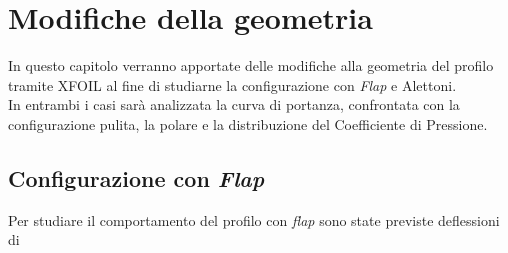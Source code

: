 \chapter{Modifiche della geometria}

In questo capitolo verranno apportate delle modifiche alla geometria del profilo tramite XFOIL al fine di studiarne la configurazione con {\itshape Flap} e Alettoni.\\
In entrambi i casi sarà analizzata la curva di portanza, confrontata con la configurazione pulita, la polare e la distribuzione del Coefficiente di Pressione.

\section {Configurazione con {\itshape Flap}}

Per studiare il comportamento del profilo con {\itshape flap} sono state previste deflessioni di 